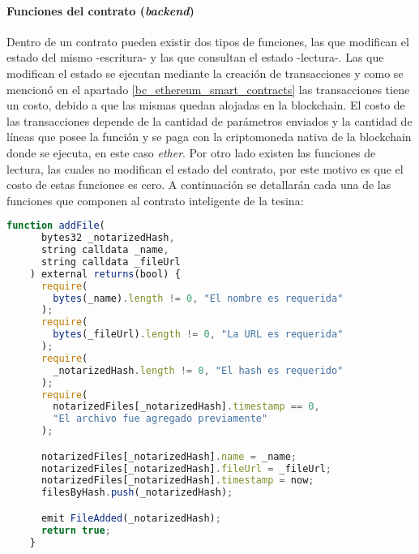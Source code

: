\paragraph{Funciones del contrato (\textit{backend})}

Dentro de un contrato pueden existir dos tipos de funciones, las que modifican el estado del mismo -escritura- y las que consultan el estado -lectura-. Las que modifican el estado se ejecutan mediante la creación de transacciones y como se mencionó en el apartado \ref{bc_ethereum_smart_contracts} las transacciones tiene un costo, debido a que las mismas quedan alojadas en la blockchain. El costo de las transacciones depende de la cantidad de parámetros enviados y la cantidad de líneas que posee la función y se paga con la criptomoneda nativa de la blockchain donde se ejecuta, en este caso \textit{ether}. Por otro lado existen las funciones de lectura, las cuales no modifican el estado del contrato, por este motivo es que el costo de estas funciones es cero. A continuación se detallarán cada una de las funciones que componen al contrato inteligente de la tesina:

\begin{minipage}{\linewidth}
  \begin{lstlisting}[frame=single, belowskip=1em, aboveskip=2em,  language=javascript, captionpos=b, caption=Función addFile, label={lst:post_archivo}]
    function addFile(
      bytes32 _notarizedHash,
      string calldata _name,
      string calldata _fileUrl
    ) external returns(bool) {
      require(
        bytes(_name).length != 0, "El nombre es requerida"
      );
      require(
        bytes(_fileUrl).length != 0, "La URL es requerida"
      );
      require(
        _notarizedHash.length != 0, "El hash es requerido"
      );
      require(
        notarizedFiles[_notarizedHash].timestamp == 0,
        "El archivo fue agregado previamente"
      );

      notarizedFiles[_notarizedHash].name = _name;
      notarizedFiles[_notarizedHash].fileUrl = _fileUrl;
      notarizedFiles[_notarizedHash].timestamp = now;
      filesByHash.push(_notarizedHash);

      emit FileAdded(_notarizedHash);
      return true;
    }
  \end{lstlisting}
\end{minipage}

